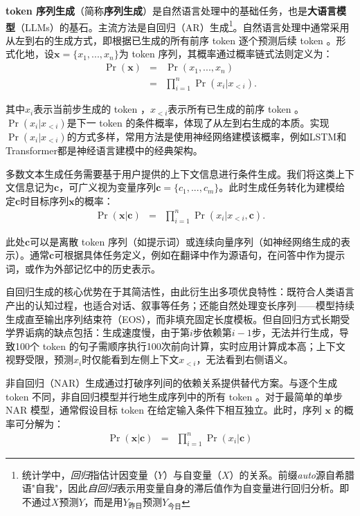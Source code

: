 \documentclass[UTF8,a4paper,zihao=-4,oneside,openany]{ctexbook}
\begin{document}
\textbf{ token 序列生成}（简称\textbf{序列生成}）是自然语言处理中的基础任务，也是\textbf{大语言模型}（LLMs）的基石\citep{radford-etal:2018improving}。主流方法是自回归（AR）生成\footnote{统计学中，\textit{回归}指估计因变量（$Y$）与自变量（$X$）的关系。前缀\textit{auto}源自希腊语"自我"，因此\textit{自回归}表示用变量自身的滞后值作为自变量进行回归分析。即不通过$X$预测$Y$，而是用$Y_{\text{昨日}}$预测$Y_{\text{今日}}$}。自然语言处理中通常采用从左到右的生成方式，即根据已生成的所有前序 token 逐个预测后续 token 。形式化地，设$\mathbf{x} = \{x_1,...,x_n\}$为 token 序列，其概率通过概率链式法则定义为：
\begin{eqnarray}
\Pr(\mathbf{x}) & = & \Pr(x_1,...,x_n) \nonumber \\
& = & \prod_{i=1}^{n} \Pr(x_i|x_{<i}).
\end{eqnarray}

\noindent 其中$x_i$表示当前步生成的 token ，$x_{<i}$表示所有已生成的前序 token 。$\Pr(x_i|x_{<i})$是下一 token 的条件概率，体现了从左到右生成的本质。实现$\Pr(x_i|x_{<i})$的方式多样，常用方法是使用神经网络建模该概率，例如LSTM和Transformer都是神经语言建模中的经典架构。

多数文本生成任务需要基于用户提供的上下文信息进行条件生成。我们将这类上下文信息记为$\mathbf{c}$，可广义视为变量序列$\mathbf{c} = \{c_1,...,c_m\}$。此时生成任务转化为建模给定$\mathbf{c}$时目标序列$\mathbf{x}$的概率：
\begin{eqnarray}
\Pr(\mathbf{x}|\mathbf{c}) & = & \prod_{i=1}^{n} \Pr(x_i|x_{<i},\mathbf{c}).
\end{eqnarray}

\noindent 此处$\mathbf{c}$可以是离散 token 序列（如提示词）或连续向量序列（如神经网络生成的表示）。通常$\mathbf{c}$可根据具体任务定义，例如在翻译中作为源语句，在问答中作为提示词，或作为外部记忆中的历史表示。

自回归生成的核心优势在于其简洁性，由此衍生出多项优良特性：既符合人类语言产出的认知过程，也适合对话、叙事等任务；还能自然处理变长序列——模型持续生成直至输出序列结束符（EOS），而非填充固定长度模板。但自回归方式长期受学界诟病的缺点包括：生成速度慢，由于第$i$步依赖第$i-1$步，无法并行生成，导致100个 token 的句子需顺序执行100次前向计算，实时应用计算成本高；上下文视野受限，预测$x_i$时仅能看到左侧上下文$x_{<i}$，无法看到右侧语义。

非自回归（NAR）生成通过打破序列间的依赖关系提供替代方案\citep{gu-etal:2018non}。与逐个生成 token 不同，非自回归模型并行地生成序列中的所有 token 。对于最简单的单步 NAR 模型，通常假设目标 token 在给定输入条件下相互独立。此时，序列 $\mathbf{x}$ 的概率可分解为：
\begin{eqnarray}
\Pr(\mathbf{x}|\mathbf{c}) & = & \prod_{i=1}^{n} \Pr(x_i|\mathbf{c})
\end{eqnarray}
\end{document}
